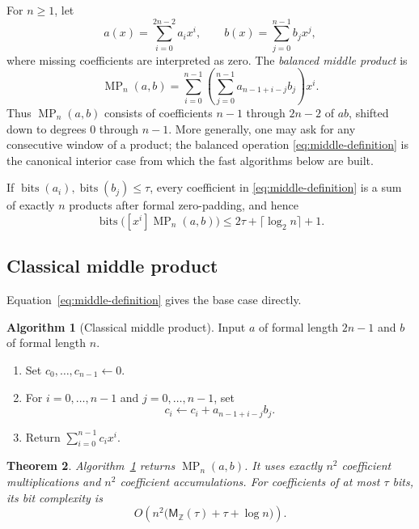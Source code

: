 \documentclass[11pt]{book}
\newtheorem{theorem}{Theorem}[section]
\theoremstyle{definition}
\newtheorem{algorithm}[theorem]{Algorithm}
\newcommand{\ZZ}{\mathbb Z}
\newcommand{\bits}{\operatorname{bits}}
\newcommand{\MZ}{\mathsf M_{\ZZ}}
\begin{document}
For $n\geq1$, let
\[
 a(x)=\sum_{i=0}^{2n-2}a_i x^i,
 \qquad
 b(x)=\sum_{j=0}^{n-1}b_j x^j,
\]
where missing coefficients are interpreted as zero.  The \emph{balanced
middle product} is
\begin{equation}\label{eq:middle-definition}
 \operatorname{MP}_n(a,b)
 =\sum_{i=0}^{n-1}
   \left(\sum_{j=0}^{n-1}a_{n-1+i-j}b_j\right)x^i.
\end{equation}
Thus $\operatorname{MP}_n(a,b)$ consists of coefficients $n-1$ through
$2n-2$ of $ab$, shifted down to degrees $0$ through $n-1$.  More generally,
one may ask for any consecutive window of a product; the balanced operation
\eqref{eq:middle-definition} is the canonical interior case from which the
fast algorithms below are built.

If $\bits(a_i),\bits(b_j)\leq\tau$, every coefficient in
\eqref{eq:middle-definition} is a sum of exactly $n$ products after formal
zero-padding, and hence
\begin{equation}\label{eq:middle-coeff-bound}
 \bits\bigl([x^i]\operatorname{MP}_n(a,b)\bigr)
 \leq 2\tau+\lceil\log_2 n\rceil+1.
\end{equation}

\subsection{Classical middle product}

Equation~\eqref{eq:middle-definition} gives the base case directly.

\begin{algorithm}[Classical middle product]\label{alg:middle-classical}
Input $a$ of formal length $2n-1$ and $b$ of formal length $n$.
\begin{enumerate}
 \item Set $c_0,\ldots,c_{n-1}\leftarrow0$.
 \item For $i=0,\ldots,n-1$ and $j=0,\ldots,n-1$, set
 \[
    c_i\leftarrow c_i+a_{n-1+i-j}b_j.
 \]
 \item Return $\sum_{i=0}^{n-1}c_ix^i$.
\end{enumerate}
\end{algorithm}

\begin{theorem}\label{thm:middle-classical}
Algorithm~\ref{alg:middle-classical} returns
$\operatorname{MP}_n(a,b)$.  It uses exactly $n^2$ coefficient
multiplications and $n^2$ coefficient accumulations.  For coefficients of at
most $\tau$ bits, its bit complexity is
\[
 O\!\left(n^2\bigl(\MZ(\tau)+\tau+\log n\bigr)\right).
\]
\end{theorem}
\end{document}
